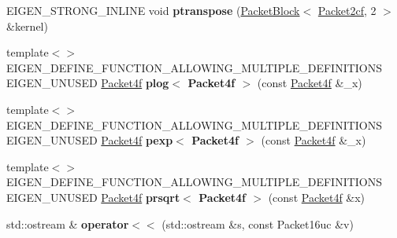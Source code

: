 \begin{DoxyCompactItemize}
E\+I\+G\+E\+N\+\_\+\+S\+T\+R\+O\+N\+G\+\_\+\+I\+N\+L\+I\+NE void {\bfseries ptranspose} (\hyperlink{struct_eigen_1_1internal_1_1_packet_block}{Packet\+Block}$<$ \hyperlink{struct_eigen_1_1internal_1_1_packet2cf}{Packet2cf}, 2 $>$ \&kernel)
\item 
\mbox{\label{namespace_eigen_1_1internal_adbf8c141f9a7f80e7c6800ffd1b459f9}} 
{\footnotesize template$<$$>$ }\\E\+I\+G\+E\+N\+\_\+\+D\+E\+F\+I\+N\+E\+\_\+\+F\+U\+N\+C\+T\+I\+O\+N\+\_\+\+A\+L\+L\+O\+W\+I\+N\+G\+\_\+\+M\+U\+L\+T\+I\+P\+L\+E\+\_\+\+D\+E\+F\+I\+N\+I\+T\+I\+O\+NS E\+I\+G\+E\+N\+\_\+\+U\+N\+U\+S\+ED \hyperlink{struct_eigen_1_1internal_1_1_packet4f}{Packet4f} {\bfseries plog$<$ Packet4f $>$} (const \hyperlink{struct_eigen_1_1internal_1_1_packet4f}{Packet4f} \&\+\_\+x)
\item 
\mbox{\label{namespace_eigen_1_1internal_ae50022746c5ddd3c92ba6eae17b22b0c}} 
{\footnotesize template$<$$>$ }\\E\+I\+G\+E\+N\+\_\+\+D\+E\+F\+I\+N\+E\+\_\+\+F\+U\+N\+C\+T\+I\+O\+N\+\_\+\+A\+L\+L\+O\+W\+I\+N\+G\+\_\+\+M\+U\+L\+T\+I\+P\+L\+E\+\_\+\+D\+E\+F\+I\+N\+I\+T\+I\+O\+NS E\+I\+G\+E\+N\+\_\+\+U\+N\+U\+S\+ED \hyperlink{struct_eigen_1_1internal_1_1_packet4f}{Packet4f} {\bfseries pexp$<$ Packet4f $>$} (const \hyperlink{struct_eigen_1_1internal_1_1_packet4f}{Packet4f} \&\+\_\+x)
\item 
\mbox{\label{namespace_eigen_1_1internal_a98b3641bf0b5b095f1879b167959c505}} 
{\footnotesize template$<$$>$ }\\E\+I\+G\+E\+N\+\_\+\+D\+E\+F\+I\+N\+E\+\_\+\+F\+U\+N\+C\+T\+I\+O\+N\+\_\+\+A\+L\+L\+O\+W\+I\+N\+G\+\_\+\+M\+U\+L\+T\+I\+P\+L\+E\+\_\+\+D\+E\+F\+I\+N\+I\+T\+I\+O\+NS E\+I\+G\+E\+N\+\_\+\+U\+N\+U\+S\+ED \hyperlink{struct_eigen_1_1internal_1_1_packet4f}{Packet4f} {\bfseries prsqrt$<$ Packet4f $>$} (const \hyperlink{struct_eigen_1_1internal_1_1_packet4f}{Packet4f} \&x)
\item 
\mbox{\label{namespace_eigen_1_1internal_a0ef948ba1edc2674c34d2ac45834fa96}} 
std\+::ostream \& {\bfseries operator$<$$<$} (std\+::ostream \&s, const Packet16uc \&v)
\item 
\mbox{\label{namespace_eigen_1_1internal_ad658d939f8574bf76cb13b223f1f869c}} 

\end{DoxyCompactItemize}
